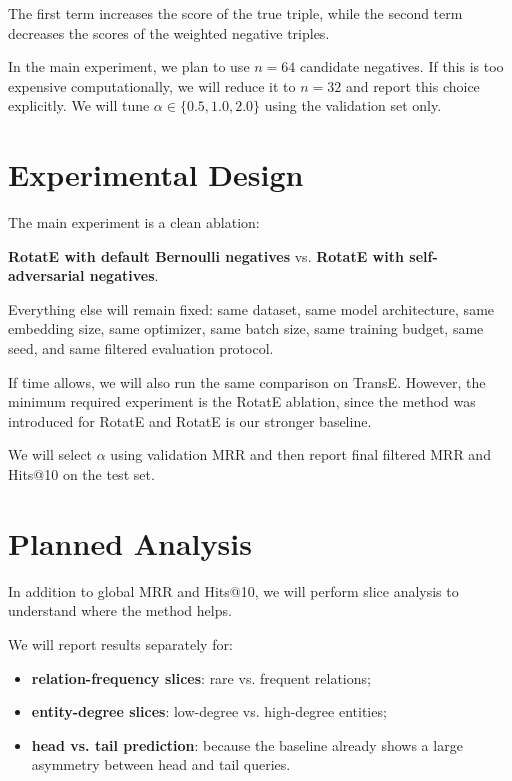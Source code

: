 \documentclass{llncs}
\begin{document}
The first term increases the score of the true triple, while the second
term decreases the scores of the weighted negative triples.

In the main experiment, we plan to use $n=64$ candidate negatives. If this
is too expensive computationally, we will reduce it to $n=32$ and report
this choice explicitly. We will tune
$\alpha \in \{0.5, 1.0, 2.0\}$ using the validation set only.

\section{Experimental Design}

The main experiment is a clean ablation:

\begin{center}
\textbf{RotatE with default Bernoulli negatives}
\quad vs. \quad
\textbf{RotatE with self-adversarial negatives}.
\end{center}

Everything else will remain fixed: same dataset, same model architecture,
same embedding size, same optimizer, same batch size, same training
budget, same seed, and same filtered evaluation protocol.

If time allows, we will also run the same comparison on TransE. However,
the minimum required experiment is the RotatE ablation, since the method
was introduced for RotatE and RotatE is our stronger baseline.

We will select $\alpha$ using validation MRR and then report final
filtered MRR and Hits@10 on the test set.

\section{Planned Analysis}

In addition to global MRR and Hits@10, we will perform slice analysis to
understand where the method helps.

We will report results separately for:

\begin{itemize}
  \item \textbf{relation-frequency slices}: rare vs. frequent relations;
  \item \textbf{entity-degree slices}: low-degree vs. high-degree entities;
  \item \textbf{head vs. tail prediction}: because the baseline already
        shows a large asymmetry between head and tail queries.
\end{itemize}
\end{document}

